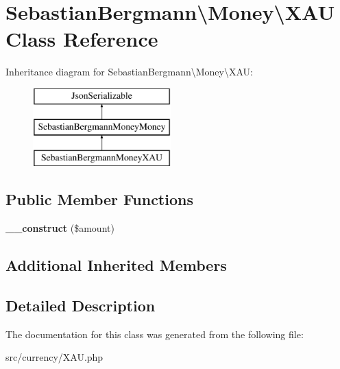 \hypertarget{classSebastianBergmann_1_1Money_1_1XAU}{}\section{Sebastian\+Bergmann\textbackslash{}Money\textbackslash{}X\+A\+U Class Reference}
\label{classSebastianBergmann_1_1Money_1_1XAU}
Inheritance diagram for Sebastian\+Bergmann\textbackslash{}Money\textbackslash{}X\+A\+U\+:\begin{figure}[H]
\begin{center}
\leavevmode
\includegraphics[height=3.000000cm]{classSebastianBergmann_1_1Money_1_1XAU}
\end{center}
\end{figure}
\subsection*{Public Member Functions}
\begin{DoxyCompactItemize}
\item 
\hypertarget{classSebastianBergmann_1_1Money_1_1XAU_ab1b6bf5f98e9ce9ebd172048b83dae08}{}{\bfseries \+\_\+\+\_\+construct} (\$amount)\label{classSebastianBergmann_1_1Money_1_1XAU_ab1b6bf5f98e9ce9ebd172048b83dae08}

\end{DoxyCompactItemize}
\subsection*{Additional Inherited Members}


\subsection{Detailed Description}


The documentation for this class was generated from the following file\+:\begin{DoxyCompactItemize}
\item 
src/currency/X\+A\+U.\+php\end{DoxyCompactItemize}

